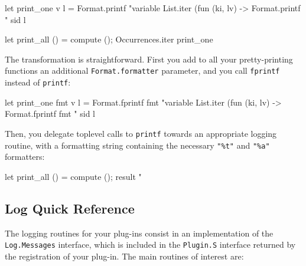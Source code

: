 \begin{ocamlcode}
let print_one v l =
  Format.printf "variable %
  List.iter
    (fun (ki, lv) ->
       Format.printf "  sid %
    l

let print_all () =
  compute ();
  Occurrences.iter print_one
\end{ocamlcode}

The transformation is straightforward. First you add to all your
pretty-printing functions an additional \texttt{Format.formatter}
parameter, and you call \texttt{fprintf} instead of \texttt{printf}:

\begin{ocamlcode}
let print_one fmt v l =
  Format.fprintf fmt "variable %
  List.iter
    (fun (ki, lv) ->
       Format.fprintf fmt "  sid %
    l
\end{ocamlcode}

Then, you delegate toplevel calls to \texttt{printf} towards an
appropriate logging routine, with a formatting string containing the
necessary \lstinline{"%t"} and \lstinline{"%a"} formatters:

\begin{ocamlcode}
let print_all () =
  compute ();
  result "%
\end{ocamlcode}


\subsection{Log Quick Reference}

The logging routines for your plug-ins consist in an implementation of
the \lstinline{Log.Messages} interface, which is included in the
\lstinline{Plugin.S} interface returned by the registration of your
plug-in. The main routines of interest are:

\newcommand{\ppcmd}[2]%
{{\small\tt {\bf #1}#2}}

\newcommand{\ppcmdprintf}[2]%
{{\small{\tt {\bf #1}#2} $<${\it options}$>$ {\tt "..."}}}

\newcommand{\logprintf}[2]{%
\item[\ppcmdprintf{#1}{#2}]%
\sscodeidxdef{Log}{Messages}{#1}\mbox{}\\%
}

\newcommand{\logprintfvariant}[2]{%
\item[\begin{tabular}{l@{ }l}%
\ppcmdprintf{#1}{}\\\ppcmdprintf{#2}{}%
\end{tabular}]%
\sscodeidx{Log}{Messages}{#1}\sscodeidx{Log}{Messages}{#2}\mbox{}\\%
}

